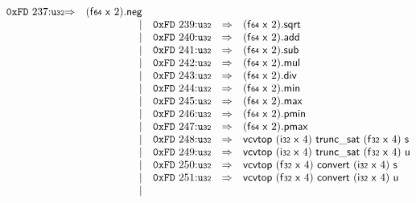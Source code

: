 $$\begin{array}{@{}l@{}rrlll@{}l@{}}
\mathtt{0xFD}~237{:}{\mathtt{u{\scriptstyle32}}} &\Rightarrow& (\mathsf{f{\scriptstyle64}}~\mathsf{x}~2) . \mathsf{neg} \\ &&|&
\mathtt{0xFD}~239{:}{\mathtt{u{\scriptstyle32}}} &\Rightarrow& (\mathsf{f{\scriptstyle64}}~\mathsf{x}~2) . \mathsf{sqrt} \\ &&|&
\mathtt{0xFD}~240{:}{\mathtt{u{\scriptstyle32}}} &\Rightarrow& (\mathsf{f{\scriptstyle64}}~\mathsf{x}~2) . \mathsf{add} \\ &&|&
\mathtt{0xFD}~241{:}{\mathtt{u{\scriptstyle32}}} &\Rightarrow& (\mathsf{f{\scriptstyle64}}~\mathsf{x}~2) . \mathsf{sub} \\ &&|&
\mathtt{0xFD}~242{:}{\mathtt{u{\scriptstyle32}}} &\Rightarrow& (\mathsf{f{\scriptstyle64}}~\mathsf{x}~2) . \mathsf{mul} \\ &&|&
\mathtt{0xFD}~243{:}{\mathtt{u{\scriptstyle32}}} &\Rightarrow& (\mathsf{f{\scriptstyle64}}~\mathsf{x}~2) . \mathsf{div} \\ &&|&
\mathtt{0xFD}~244{:}{\mathtt{u{\scriptstyle32}}} &\Rightarrow& (\mathsf{f{\scriptstyle64}}~\mathsf{x}~2) . \mathsf{min} \\ &&|&
\mathtt{0xFD}~245{:}{\mathtt{u{\scriptstyle32}}} &\Rightarrow& (\mathsf{f{\scriptstyle64}}~\mathsf{x}~2) . \mathsf{max} \\ &&|&
\mathtt{0xFD}~246{:}{\mathtt{u{\scriptstyle32}}} &\Rightarrow& (\mathsf{f{\scriptstyle64}}~\mathsf{x}~2) . \mathsf{pmin} \\ &&|&
\mathtt{0xFD}~247{:}{\mathtt{u{\scriptstyle32}}} &\Rightarrow& (\mathsf{f{\scriptstyle64}}~\mathsf{x}~2) . \mathsf{pmax} \\ &&|&
\mathtt{0xFD}~248{:}{\mathtt{u{\scriptstyle32}}} &\Rightarrow& \mathsf{vcvtop}~(\mathsf{i{\scriptstyle32}}~\mathsf{x}~4)~\mathsf{trunc\_sat}~(\mathsf{f{\scriptstyle32}}~\mathsf{x}~4)~\mathsf{s} \\ &&|&
\mathtt{0xFD}~249{:}{\mathtt{u{\scriptstyle32}}} &\Rightarrow& \mathsf{vcvtop}~(\mathsf{i{\scriptstyle32}}~\mathsf{x}~4)~\mathsf{trunc\_sat}~(\mathsf{f{\scriptstyle32}}~\mathsf{x}~4)~\mathsf{u} \\ &&|&
\mathtt{0xFD}~250{:}{\mathtt{u{\scriptstyle32}}} &\Rightarrow& \mathsf{vcvtop}~(\mathsf{f{\scriptstyle32}}~\mathsf{x}~4)~\mathsf{convert}~(\mathsf{i{\scriptstyle32}}~\mathsf{x}~4)~\mathsf{s} \\ &&|&
\mathtt{0xFD}~251{:}{\mathtt{u{\scriptstyle32}}} &\Rightarrow& \mathsf{vcvtop}~(\mathsf{f{\scriptstyle32}}~\mathsf{x}~4)~\mathsf{convert}~(\mathsf{i{\scriptstyle32}}~\mathsf{x}~4)~\mathsf{u} \\ &&|&

\end{array}$$
